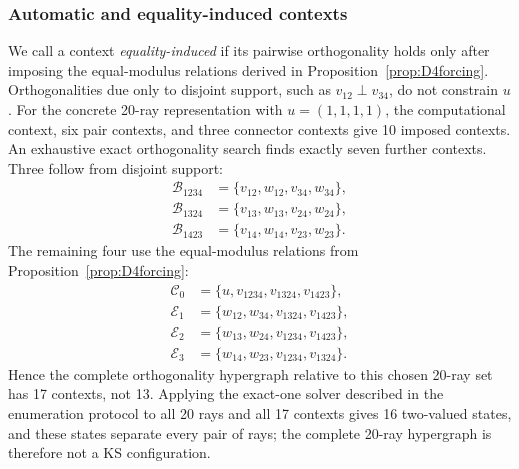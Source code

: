 \documentclass[%
  reprint,
  superscriptaddress,
  showpacs,
  showkeys,
  amsmath,amssymb,
  pra,
  longbibliography,
  floatfix,
  x11names
]{revtex4-2}
\newenvironment{revision}{\begingroup\color{revisionblue}}{\endgroup}
\begin{document}
\begin{revision}
\subsubsection{Automatic and equality-induced contexts}
We call a context \emph{equality-induced} if its pairwise orthogonality holds only after imposing the equal-modulus relations derived in Proposition~\ref{prop:D4forcing}.  Orthogonalities due only to disjoint support, such as $v_{12}\perp v_{34}$, do not constrain $u$.  For the concrete 20-ray representation with $u=(1,1,1,1)$, the computational context, six pair contexts, and three connector contexts give 10 imposed contexts.  An exhaustive exact orthogonality search finds exactly seven further contexts.  Three follow from disjoint support:
\begin{align*}
\mathcal{B}_{1234}&=\{v_{12},w_{12},v_{34},w_{34}\},\\
\mathcal{B}_{1324}&=\{v_{13},w_{13},v_{24},w_{24}\},\\
\mathcal{B}_{1423}&=\{v_{14},w_{14},v_{23},w_{23}\}.
\end{align*}
The remaining four use the equal-modulus relations from Proposition~\ref{prop:D4forcing}:
\begin{align*}
\mathcal{C}_0&=\{u,v_{1234},v_{1324},v_{1423}\},\\
\mathcal{E}_1&=\{w_{12},w_{34},v_{1324},v_{1423}\},\\
\mathcal{E}_2&=\{w_{13},w_{24},v_{1234},v_{1423}\},\\
\mathcal{E}_3&=\{w_{14},w_{23},v_{1234},v_{1324}\}.
\end{align*}
Hence the complete orthogonality hypergraph relative to this chosen 20-ray set has 17 contexts, not 13.  Applying the exact-one solver described in the enumeration protocol to all 20 rays and all 17 contexts gives 16 two-valued states, and these states separate every pair of rays; the complete 20-ray hypergraph is therefore not a KS configuration.
\end{revision}
\end{document}
